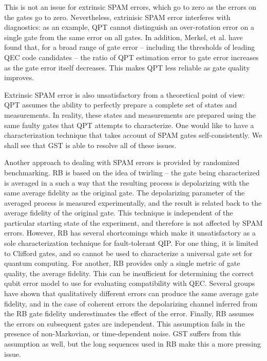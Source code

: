 \documentclass[11pt, oneside]{article}   	%
\begin{document}
This is not an issue for extrinsic SPAM errors, which go to zero as the errors on the gates go to zero. 
Nevertheless, extrinisic SPAM error interferes with diagnostics: as an example, QPT cannot distinguish an over-rotation error on a single gate from the same error on all gates. 
In addition, Merkel, et al. have found that, for a broad range of gate error -- including the thresholds of leading QEC code candidates -- the ratio of QPT estimation error to gate error increases as the gate error itself decreases. 
This makes QPT less reliable as gate quality improves.

Extrinsic SPAM error is also unsatisfactory from a theoretical point of view: QPT assumes the ability to perfectly prepare a complete set of states and measurements. 
In reality, these states and measurements are prepared using the same faulty gates that QPT attempts to characterize. 
One would like to have a characterization technique that takes account of SPAM gates self-consistently. 
We shall see that GST is able to resolve all of these issues.

Another approach to dealing with SPAM errors is provided by randomized benchmarking. 
RB is based on the idea of twirling -- the gate being characterized is averaged in a such a way that the resulting process is depolarizing with the same average fidelity as the original gate. 
The depolarizing parameter of the averaged process is measured experimentally, and the result is related back to the average fidelity of the original gate. 
This technique is independent of the particular starting state of the experiment, and therefore is not affected by SPAM errors. 
However, RB has several shortcomings which make it unsatisfactory as a sole characterization technique for fault-tolerant QIP. 
For one thing, it is limited to Clifford gates, and so cannot be used to characterize a universal gate set for quantum computing. 
For another, RB provides only a single metric of gate quality, the average fidelity. 
This can be insufficient for determining the correct qubit error model to use for evaluating compatibility with QEC. 
Several groups have shown that qualitatively different errors can produce the same average gate fidelity, and in the case of coherent errors the depolarizing channel inferred from the RB gate fidelity underestimates the effect of the error. 
Finally, RB assumes the errors on subsequent gates are independent. 
This assumption fails in the presence of non-Markovian, or time-dependent noise. 
GST suffers from this assumption as well, but the long sequences used in RB make this a more pressing issue.
\end{document}
